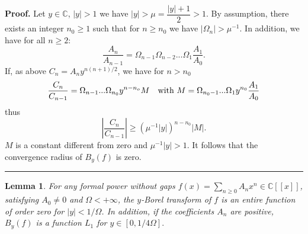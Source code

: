 \documentclass{article}
\newtheorem{lemma}[theorem]{Lemma}
\newenvironment{proof}[1][Proof]{\textbf{#1.} }{\ \rule{0.5em}{0.5em}}
\begin{document}
\begin{proof}
\bigskip Let $y\in \mathbb{C}$, $\left| y\right| >1$ we have $\left|
y\right| >\mu =\dfrac{\left| y\right| +1}{2}>1.$ By assumption, there exists
an integer $n_{0}\geq 1$ such that for $n\geq n_{0}$ we have $\left| \Omega
_{n}\right| >\mu ^{-1}$. In addition, we have for all $n\geq 2$: 
\begin{equation*}
\dfrac{A_{n}}{A_{n-1}}=\Omega _{n-1}\Omega _{n-2}...\Omega _{1}\dfrac{A_{1}}{A_{0}}.
\end{equation*}
If, as above $C_{n}=A_{n}y^{n\left( n+1\right) /2}$, we have for $n>n_{0}$ 
\begin{equation*}
\dfrac{C_{n}}{C_{n-1}}=\Omega _{n-1}...\Omega _{n_{0}}y^{n-n_{o}}M\text{ \ \
with }M=\Omega _{n_{0}-1}...\Omega _{1}y^{n_{0}}\dfrac{A_{1}}{A_{0}}
\end{equation*}
thus 
\begin{equation*}
\left| \dfrac{C_{n}}{C_{n-1}}\right| \geq \left( \mu ^{-1}\left| y\right|
\right) ^{n-n_{0}}\left| M\right| .
\end{equation*}
$M$ is a constant different from zero and $\mu ^{-1}\left| y\right| >1$. It
follows that the convergence radius of $B_{y}\left( f\right) $ is zero.
\end{proof}

\bigskip

\begin{lemma}
\bigskip \bigskip \bigskip For any formal power without gaps $f\left(
x\right) =\sum_{n\geq 0}A_{n}x^{n}\in \mathbb{C}\left[ \left[ x\right] \right] $, satisfying $A_{0}\neq 0$ and $\Omega <+\infty $, the $y$-Borel
transform of $f$ is an entire function of order zero for $\left| y\right|
<1/\Omega $. In addition, if the coefficients $A_{n}$ are positive, $B_{y}\left( f\right) $ is a function $L_{1}$ for $y\in \left[ 0,1/4\Omega \right] .$
\end{lemma}
\end{document}
